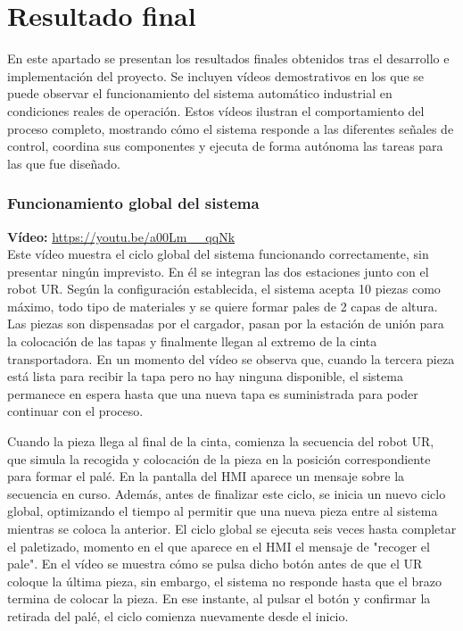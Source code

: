 \section{Resultado final}
\label{sec:resultado_final}

En este apartado se presentan los resultados finales obtenidos tras el desarrollo e implementación del proyecto. Se incluyen vídeos demostrativos en los que se puede observar el funcionamiento del sistema automático industrial en condiciones reales de operación. Estos vídeos ilustran el comportamiento del proceso completo, mostrando cómo el sistema responde a las diferentes señales de control, coordina sus componentes y ejecuta de forma autónoma las tareas para las que fue diseñado. 

\clearpage

\subsubsection{Funcionamiento global del sistema}

\textbf{Vídeo:} \url{https://youtu.be/a00Lm__qqNk} \\

Este vídeo muestra el ciclo global del sistema funcionando correctamente, sin presentar ningún imprevisto. En él se integran las dos estaciones junto con el robot UR. Según la configuración establecida, el sistema acepta 10 piezas como máximo, todo tipo de materiales y se quiere formar pales de 2 capas de altura. Las piezas son dispensadas por el cargador, pasan por la estación de unión para la colocación de las tapas y finalmente llegan al extremo de la cinta transportadora. En un momento del vídeo se observa que, cuando la tercera pieza está lista para recibir la tapa pero no hay ninguna disponible, el sistema permanece en espera hasta que una nueva tapa es suministrada para poder continuar con el proceso. 

Cuando la pieza llega al final de la cinta, comienza la secuencia del robot UR, que simula la recogida y  colocación de la pieza en la posición correspondiente para formar el palé. En la pantalla del HMI aparece un mensaje sobre la secuencia en curso. Además, antes de finalizar este ciclo, se inicia un nuevo ciclo global, optimizando el tiempo al permitir que una nueva pieza entre al sistema mientras se coloca la anterior. El ciclo global se ejecuta seis veces hasta completar el paletizado, momento en el que aparece en el HMI el mensaje de "recoger el pale". En el vídeo se muestra cómo se pulsa dicho botón antes de que el UR coloque la última pieza, sin embargo, el sistema no responde hasta que el brazo termina de colocar la pieza. En ese instante, al pulsar el botón y confirmar la retirada del palé, el ciclo comienza nuevamente desde el inicio. \\

